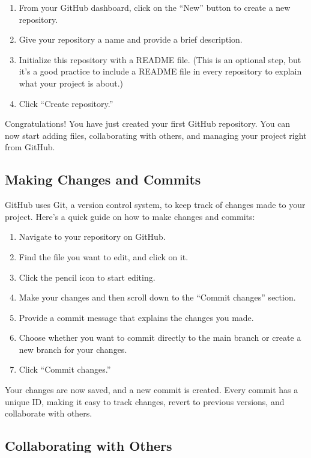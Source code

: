 \documentclass[a4paper,12pt]{book}
\begin{document}
\begin{enumerate}
    \item From your GitHub dashboard, click on the “New” button to create a new repository.
    \item Give your repository a name and provide a brief description.
    \item Initialize this repository with a README file. (This is an optional step, but it’s a good practice to include a README file in every repository to explain what your project is about.)
    \item Click “Create repository.”
\end{enumerate}

Congratulations! You have just created your first GitHub repository. You can now start adding files, collaborating with others, and managing your project right from GitHub.

\subsection*{Making Changes and Commits}

GitHub uses Git, a version control system, to keep track of changes made to your project. Here’s a quick guide on how to make changes and commits:

\begin{enumerate}
    \item Navigate to your repository on GitHub.
    \item Find the file you want to edit, and click on it.
    \item Click the pencil icon to start editing.
    \item Make your changes and then scroll down to the “Commit changes” section.
    \item Provide a commit message that explains the changes you made.
    \item Choose whether you want to commit directly to the main branch or create a new branch for your changes.
    \item Click “Commit changes.”
\end{enumerate}

Your changes are now saved, and a new commit is created. Every commit has a unique ID, making it easy to track changes, revert to previous versions, and collaborate with others.

\subsection*{Collaborating with Others}
\end{document}
